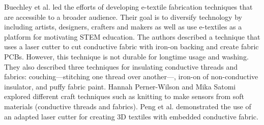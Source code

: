 Buechley et al. \cite{Buechley2009} led the efforts of developing e-textile fabrication techniques that are accessible to a broader audience. Their goal is to diversify technology by including artists, designers, crafters and makers as well as use e-textiles as a platform for motivating STEM education. The authors described a technique that uses a laser cutter to cut conductive fabric with iron-on backing and create fabric PCBs. However, this technique is not durable for longtime usage and washing. They also described three techniques for insulating conductive threads and fabrics: couching---stitching one thread over another---, iron-on of non-conductive insulator, and puffy fabric paint. Hannah Perner-Wilson and Mika Satomi \cite{perner2011handcrafting} explored different craft techniques such as knitting to make sensors from soft materials (conductive threads and fabrics). Peng et al. \cite{peng2015layered} demonstrated the use of an adapted laser cutter for creating 3D textiles with embedded conductive fabric.





